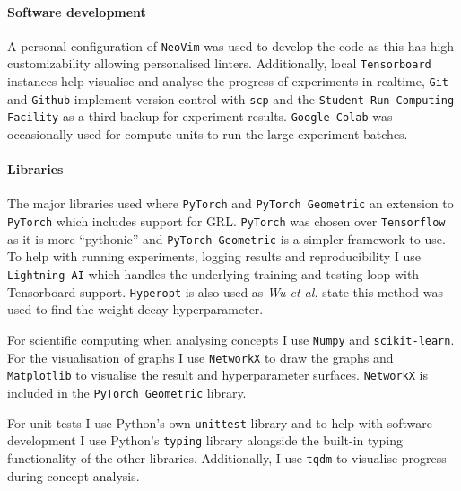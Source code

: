 \paragraph{Software development}

A personal configuration of \texttt{NeoVim} was used to develop the code as this has high customizability allowing personalised linters.
Additionally, local \texttt{Tensorboard}\cite{tensorflow2015-whitepaper} instances help visualise and analyse the progress of experiments in realtime, \texttt{Git} and \texttt{Github} implement version control with \texttt{scp} and the \texttt{Student Run Computing Facility} as a third backup for experiment results.
\texttt{Google Colab} was occasionally used for compute units to run the large experiment batches.

\paragraph{Libraries}
\label{sec:libraries}

The major libraries used where \texttt{PyTorch}\cite{paszke2019pytorch} and \texttt{PyTorch Geometric}\cite{Fey/Lenssen/2019} an extension to \texttt{PyTorch} which includes support for GRL.
\texttt{PyTorch} was chosen over \texttt{Tensorflow}\cite{tensorflow2015-whitepaper} as it is more ``pythonic'' and \texttt{PyTorch Geometric} is a simpler framework to use.
To help with running experiments, logging results and reproducibility I use \texttt{Lightning AI} which handles the underlying training and testing loop with Tensorboard support.
\texttt{Hyperopt}\cite{bergstra2013making} is also used as \textit{Wu et al.}\cite{wu2019simplifying} state this method was used to find the weight decay hyperparameter.

For scientific computing when analysing concepts I use \texttt{Numpy} and \texttt{scikit-learn}\cite{scikit-learn}. For the visualisation of graphs I use \texttt{NetworkX}\cite{SciPyProceedings_11} to draw the graphs and \texttt{Matplotlib}\cite{Hunter:2007} to visualise the result and hyperparameter surfaces. \texttt{NetworkX} is included in the \texttt{PyTorch Geometric} library.

For unit tests I use Python's own \texttt{unittest} library and to help with software development I use Python's \texttt{typing} library alongside the built-in typing functionality of the other libraries. Additionally, I use \texttt{tqdm}\cite{casper_da_costa_luis_2023_7697295} to visualise progress during concept analysis.

